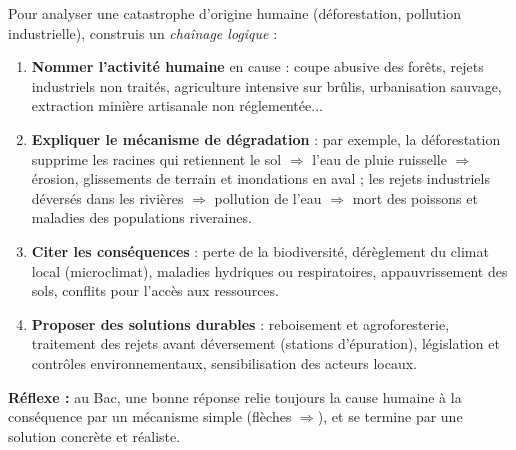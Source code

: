 \documentclass[11pt]{article}
\begin{document}
\begin{methode}
Pour analyser une catastrophe d'origine humaine (déforestation, pollution industrielle), construis un \emph{chaînage logique} :
\begin{enumerate}
\item \textbf{Nommer l'activité humaine} en cause : coupe abusive des forêts, rejets industriels non traités, agriculture intensive sur brûlis, urbanisation sauvage, extraction minière artisanale non réglementée...
\item \textbf{Expliquer le mécanisme de dégradation} : par exemple, la déforestation supprime les racines qui retiennent le sol $\Rightarrow$ l'eau de pluie ruisselle $\Rightarrow$ érosion, glissements de terrain et inondations en aval ; les rejets industriels déversés dans les rivières $\Rightarrow$ pollution de l'eau $\Rightarrow$ mort des poissons et maladies des populations riveraines.
\item \textbf{Citer les conséquences} : perte de la biodiversité, dérèglement du climat local (microclimat), maladies hydriques ou respiratoires, appauvrissement des sols, conflits pour l'accès aux ressources.
\item \textbf{Proposer des solutions durables} : reboisement et agroforesterie, traitement des rejets avant déversement (stations d'épuration), législation et contrôles environnementaux, sensibilisation des acteurs locaux.
\end{enumerate}
\textbf{Réflexe :} au Bac, une bonne réponse relie toujours la cause humaine à la conséquence par un mécanisme simple (flèches $\Rightarrow$), et se termine par une solution concrète et réaliste.
\end{methode}
\end{document}
